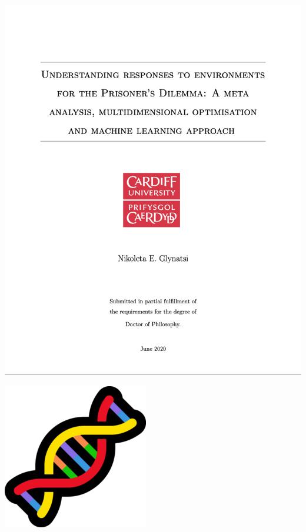 \documentclass{beamer}
\begin{document}
%     

\begin{frame}
    \centering
    \includegraphics[width=.75\textwidth]{static/Thesis}
\end{frame}

\begin{frame}
    \centering
    \includegraphics[width=.35\textwidth]{static/evolution.png}
\end{frame}


\begin{frame}
    \begin{center}
    
    \end{center}
\end{frame}
\end{document}
